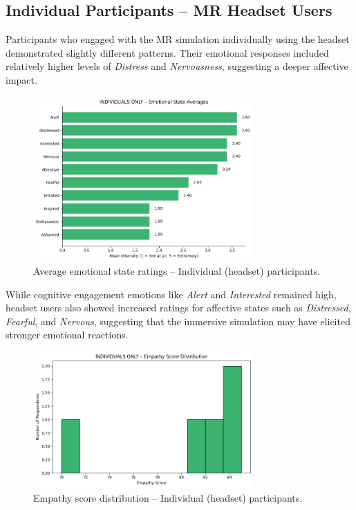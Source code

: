 \subsection{Individual Participants – MR Headset Users}

Participants who engaged with the MR simulation individually using the headset demonstrated slightly different patterns. Their emotional responses included relatively higher levels of \textit{Distress} and \textit{Nervousness}, suggesting a deeper affective impact.

\begin{figure}[H]
    \centering
    \includegraphics[width=0.75\textwidth]{../../Figures/emotional-post-indiv.png}
    \caption{Average emotional state ratings – Individual (headset) participants.}
    \label{fig:emotional_post_indiv}
\end{figure}

While cognitive engagement emotions like \textit{Alert} and \textit{Interested} remained high, headset users also showed increased ratings for affective states such as \textit{Distressed}, \textit{Fearful}, and \textit{Nervous}, suggesting that the immersive simulation may have elicited stronger emotional reactions.

\begin{figure}[H]
    \centering
    \includegraphics[width=0.75\textwidth]{../../Figures/empathy-score-post-indiv.png}
    \caption{Empathy score distribution – Individual (headset) participants.}
    \label{fig:empathy_indiv_post}
\end{figure}

